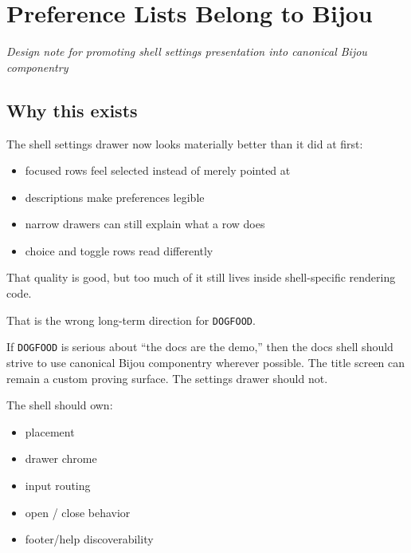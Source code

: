\chapter{Preference Lists Belong to Bijou}\label{record-054}

\smallskip

\emph{Design note for promoting shell settings presentation into canonical Bijou componentry}

\section{Why this exists}\label{record-054-why-this-exists}

The shell settings drawer now looks materially better than it did at first:

\begin{itemize}
\tightlist
\item
  focused rows feel selected instead of merely pointed at
\item
  descriptions make preferences legible
\item
  narrow drawers can still explain what a row does
\item
  choice and toggle rows read differently
\end{itemize}

That quality is good, but too much of it still lives inside shell-specific rendering code.

That is the wrong long-term direction for \texttt{D\allowbreak{}O\allowbreak{}G\allowbreak{}F\allowbreak{}O\allowbreak{}O\allowbreak{}D}.

If \texttt{D\allowbreak{}O\allowbreak{}G\allowbreak{}F\allowbreak{}O\allowbreak{}O\allowbreak{}D} is serious about ``the docs are the demo,'' then the docs shell should strive to use canonical Bijou componentry wherever possible. The title screen can remain a custom proving surface. The settings drawer should not.

The shell should own:

\begin{itemize}
\tightlist
\item
  placement
\item
  drawer chrome
\item
  input routing
\item
  open / close behavior
\item
  footer/help discoverability
\end{itemize}

